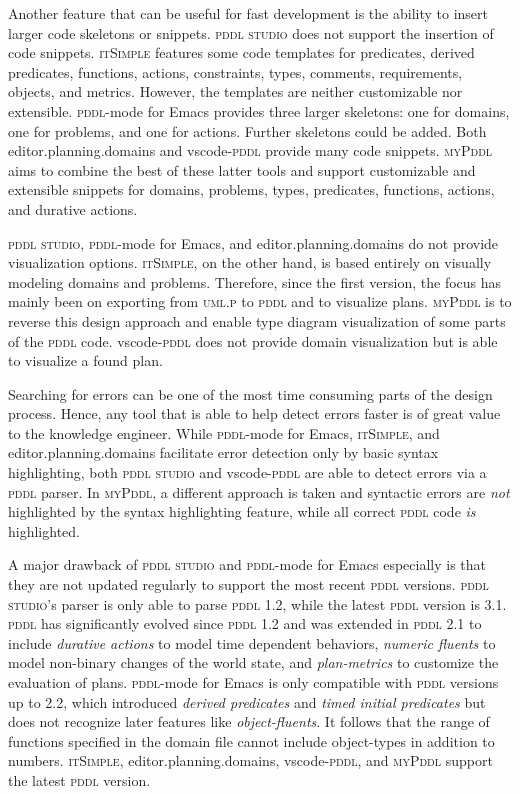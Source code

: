 \documentclass[runningheads]{llncs}
\newcommand{\mypddl}{\textsc{myPddl}\xspace}
\newcommand{\pddlstudio}{\textsc{pddl studio}\xspace}
\newcommand{\epd}{editor.planning.domains\xspace}
\newcommand{\itsimple}{\textsc{itSimple}\xspace}
\newcommand{\pddlmode}{\textsc{pddl}-mode\xspace}
\newcommand{\vscode}{vscode-\textsc{pddl}\xspace}
\newcommand{\pddl}{\textsc{pddl}\xspace}
\begin{document}
Another feature that can be useful for fast development is the ability
to insert larger code skeletons or snippets. \pddlstudio does not
support the insertion of code snippets. \itsimple features some code
templates for predicates, derived predicates, functions, actions,
constraints, types, comments, requirements, objects, and
metrics. However, the templates are neither customizable nor
extensible. \pddlmode for Emacs provides three larger skeletons: one
for domains, one for problems, and one for actions. Further skeletons
could be added. Both \epd and \vscode provide many code
snippets. \mypddl aims to combine the best of these latter tools and
support customizable and extensible snippets for domains, problems,
types, predicates, functions, actions, and durative actions.

\pddlstudio, \pddlmode for Emacs, and \epd do not provide
visualization options. \itsimple, on the other hand, is based entirely
on visually modeling domains and problems. Therefore, since the first
version, the focus has mainly been on exporting from \textsc{uml.p} to
\pddl and to visualize plans. \mypddl is to reverse this design
approach and enable type diagram visualization of some parts of the
\pddl code. \vscode does not provide domain visualization but is able
to visualize a found plan.

Searching for errors can be one of the most time consuming parts of
the design process. Hence, any tool that is able to help detect errors
faster is of great value to the knowledge engineer. While \pddlmode
for Emacs, \itsimple, and \epd facilitate error detection only by
basic syntax highlighting, both \pddlstudio and \vscode are able to
detect errors via a \pddl parser. In \mypddl, a different approach is
taken and syntactic errors are \emph{not} highlighted by the syntax
highlighting feature, while all correct \pddl code \emph{is}
highlighted.

A major drawback of \pddlstudio and \pddlmode for Emacs especially is
that they are not updated regularly to support the most recent \pddl
versions. \pddlstudio's parser is only able to parse \pddl 1.2, while
the latest \pddl version is 3.1. \pddl has significantly evolved since
\pddl 1.2 and was extended in \pddl 2.1 to include \emph{durative
  actions} to model time dependent behaviors, \emph{numeric fluents}
to model non-binary changes of the world state, and
\emph{plan-metrics} to customize the evaluation of plans. \pddlmode
for Emacs is only compatible with \pddl versions up to 2.2, which
introduced \emph{derived predicates} and \emph{timed initial
  predicates} but does not recognize later features like
\emph{object-fluents}. It follows that the range of functions
specified in the domain file cannot include object-types in addition
to numbers. \itsimple, \epd, \vscode, and \mypddl support the latest
\pddl version.
\end{document}
